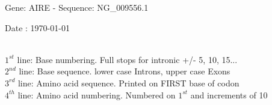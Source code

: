\documentclass{article}
\begin{document}
\renewcommand{\footrulewidth}{1pt}
\renewcommand{\headrulewidth}{0pt}
\begin{center}
\begin{large}
 Gene: AIRE - Sequence: NG\_009556.1
 
 Date : \today\\\\
\end{large}
\end{center}
$1^{st}$ line: Base numbering. Full stops for intronic +/- 5, 10, 15...\\
$2^{nd}$ line: Base sequence. lower case Introns, upper case Exons\\
$3^{rd}$ line: Amino acid sequence. Printed on FIRST base of codon\\
$4^{th}$ line: Amino acid numbering. Numbered on $1^{st}$ and increments of 10\\
\end{document}

